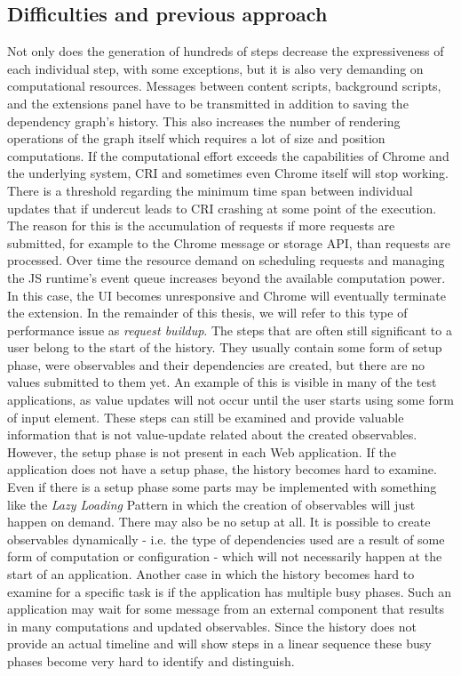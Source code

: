 \subsection{Difficulties and previous approach}
Not only does the generation of hundreds of steps decrease the expressiveness of each individual step, with some exceptions, but it is also very demanding on computational resources. Messages between content scripts, background scripts, and the extensions panel have to be transmitted in addition to saving the dependency graph's history. This also increases the number of rendering operations of the graph itself which requires a lot of size and position computations. If the computational effort exceeds the capabilities of Chrome and the underlying system, CRI and sometimes even Chrome itself will stop working. There is a threshold regarding the minimum time span between individual updates that if undercut leads to CRI crashing at some point of the execution. The reason for this is the accumulation of requests if more requests are submitted, for example to the Chrome message or storage API, than requests are processed. Over time the resource demand on scheduling requests and managing the JS runtime's event queue increases beyond the available computation power. In this case, the UI becomes unresponsive and Chrome will eventually terminate the extension. In the remainder of this thesis, we will refer to this type of performance issue as \emph{request buildup}.
The steps that are often still significant to a user belong to the start of the history. They usually contain some form of setup phase, were observables and their dependencies are created, but there are no values submitted to them yet. An example of this is visible in many of the test applications, as value updates will not occur until the user starts using some form of input element.
 These steps can still be examined and provide valuable information that is not value-update related about the created observables. However, the setup phase is not present in each Web application. If the application does not have a setup phase, the history becomes hard to examine. Even if there is a setup phase some parts may be implemented with something like the \emph{Lazy Loading} Pattern \cite{Lazy} in which the creation of observables will just happen on demand. There may also be no setup at all. It is possible to create observables dynamically - i.e. the type of dependencies used are a result of some form of computation or configuration - which will not necessarily happen at the start of an application. Another case in which the history becomes hard to examine for a specific task is if the application has multiple busy phases. Such an application may wait for some message from an external component that results in many computations and updated observables. Since the history does not provide an actual timeline and will show steps in a linear sequence these busy phases become very hard to identify and distinguish. 
